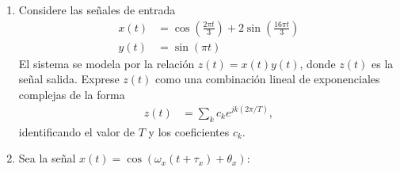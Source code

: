 \documentclass[letterpaper, 12pt]{article}
\newif\ifanswers
\begin{document}
\begin{enumerate}


    \item Considere las señales de entrada
    \begin{align*}
        x(t) &= \cos\left(\frac{2\pi t}{3}\right) + 2 \sin\left(\frac{16 \pi t}{3}\right) \\
        y(t) &= \sin(\pi t)
    \end{align*}
        El sistema se modela por la relación $z(t)=x(t)y(t)$, donde $z(t)$ es la señal salida.
        Exprese $z(t)$ como una combinación lineal de exponenciales complejas de la forma
        \begin{align*}
            z(t) &= \sum_{k} c_k e^{j k (2\pi/T)},
        \end{align*}
        identificando el valor de $T$ y los coeficientes $c_k$.
  

    \ifanswers
  {\color{red}  \textbf{Solución:}

    Las señales $x(t)$ e $y(t)$ se pueden descomponer como una suma de exponenciales complejas, lo que lleva a
    \begin{align*}
        x(t) &= \frac{1}{2} e^{j(2\pi t/3)} + \frac{1}{2} e^{-2\pi t/3}+\frac{e^{16\pi t/3}}{j}-\frac{e^{-16\pi t /3}}{j} \\
        y(t) &= \frac{e^{j\pi t}}{2j}-\frac{e^{-j\pi t}}{2j}
    \end{align*}
    Luego, $z(t)$ será
    \begin{align*}
        z(t) &= \frac{1}{4j}e^{j5\pi t /3} - \frac{1}{4j}e^{-j\pi t /3}+\frac{1}{4j}e^{j\pi t/3}-\frac{1}{4j}e^{-j5\pi t/3} - \frac{1}{2}e^{j19\pi t/3} + \frac{1}{2}e^{j13\pi t/3}-\frac{1}{2}e^{-j13\pi t/3}-\frac{1}{2}e^{-j19\pi t/3}
    \end{align*}

    Se puede notar que todas las exponenciales complejas son potencias de $e^{j\pi t/3}$, por lo que $T = \frac{2\pi}{(\pi/3)} = 6 \ [s]$. Los coeficientes son los que multiplican cada exponencial compleja.}
    \fi

    \item Sea la señal $x(t) = \cos{(\omega_x(t+\tau_x)+\theta_x)}$:


\end{enumerate}
\end{document}
